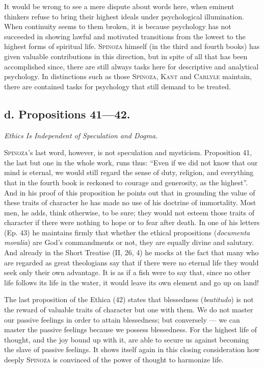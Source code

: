 \documentclass[12pt]{article}
\newcommand{\opage}[1]{\marginnote{\footnotesize\textit{[#1]}}}
\begin{document}
It would be wrong to see a mere dispute about words here, when eminent thinkers refuse to bring
their highest ideals under psychological illumination. When continuity seems to them broken, it is
because psychology has not succeeded in showing lawful and motivated transitions from the lowest to
the highest forms of spiritual life. \textsc{Spinoza} himself (in the third and fourth books) has
given valuable contributions in this direction, but in spite of all that has been accomplished
since, there are still always tasks here for descriptive and analytical psychology. In distinctions
such as those \textsc{Spinoza}, \textsc{Kant} and \textsc{Carlyle} maintain, there are contained
tasks for psychology that still demand to be treated.

\opage{94}\subsection*{d. Propositions 41---42.}
\begin{center}\textit{Ethics Is Independent of Speculation and Dogma.}\end{center}

\textsc{Spinoza}'s last word, however, is not speculation and mysticism. Proposition 41, the last
but one in the whole work, runs thus: ``Even if we did not know that our mind is eternal, we would
still regard the sense of duty, religion, and everything that in the fourth book is reckoned to
courage and generosity, as the highest''. And in his proof of this proposition he points out that
in grounding the value of these traits of character he has made no use of his doctrine of
immortality. Most men, he adds, think otherwise, to be sure; they would not esteem those traits of
character if there were nothing to hope or to fear after death. In one of his letters (Ep. 43) he
maintains firmly that whether the ethical propositions (\textit{documenta moralia}) are God's
commandments or not, they are equally divine and salutary. And already in the Short Treatise (II,
26, 4) he mocks at the fact that many who are regarded as great theologians say that if there were
no eternal life they would seek only their own advantage. It is as if a fish were to say that,
since no other life follows its life in the water, it would leave its own element and go up on
land!

The last proposition of the Ethica (42) states that blessedness (\textit{beatitudo}) is not the
reward of valuable traits of character but one with them. We do not master our passive feelings in
order to attain blessedness; but conversely --- we can master the passive feelings because we
possess blessedness. For the highest life of thought, and the joy bound up with it, are able to
secure us against becoming the slave of passive feelings. It shows itself again in this closing
consideration how deeply \textsc{Spinoza} is convinced of the power of thought to harmonize life.
\end{document}
